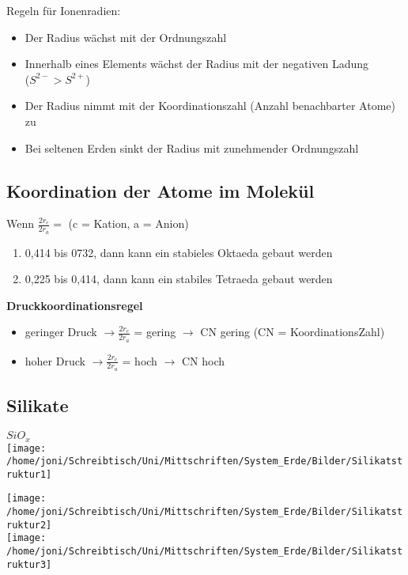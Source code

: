 \documentclass[a4,12pt]{scrreprt}
\begin{document}
Regeln für Ionenradien:\\
\begin{itemize}
\item Der Radius wächst mit der Ordnungszahl
\item Innerhalb eines Elements wächst der Radius mit der negativen Ladung\\ ($S^{2-}>S^{2+}$)
\item Der Radius nimmt mit der Koordinationszahl (Anzahl benachbarter Atome) zu
\item Bei seltenen Erden sinkt der Radius mit zunehmender Ordnungszahl
\end{itemize}

\subsection{Koordination der Atome im Molekül} \label{sec:Koordination der Atome im Molekül}

Wenn $\frac{2r_c}{2r_a} =$ (c = Kation, a = Anion)
\begin{enumerate}
\item 0,414	bis 0732, dann kann ein stabieles Oktaeda gebaut werden
\item 0,225 bis 0,414, dann kann ein stabiles Tetraeda gebaut werden
\end{enumerate}

\textbf{Druckkoordinationsregel}

\begin{itemize}
\item geringer Druck $\rightarrow \frac{2r_c}{2r_a}$ = gering $\rightarrow$ CN gering (CN = KoordinationsZahl)
\item hoher Druck $\rightarrow \frac{2r_c}{2r_a}$ = hoch $\rightarrow$ CN hoch
\end{itemize}

\newpage
\subsection{Silikate} \label{sec:Silikate}
$SiO_x$\\ 

\texttt{[image: /home/joni/Schreibtisch/Uni/Mittschriften/System\_Erde/Bilder/Silikatstruktur1]}

\texttt{[image: /home/joni/Schreibtisch/Uni/Mittschriften/System\_Erde/Bilder/Silikatstruktur2]}\\

\texttt{[image: /home/joni/Schreibtisch/Uni/Mittschriften/System\_Erde/Bilder/Silikatstruktur3]}\\
\end{document}
